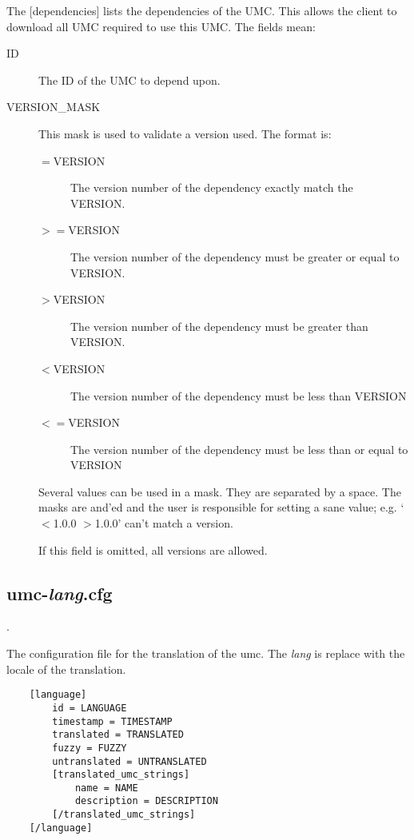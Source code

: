 The [dependencies] lists the dependencies of the UMC. This allows the client
to download all UMC required to use this UMC. The fields mean:
\begin{description}
\item[ID]
	The ID of the UMC to depend upon.

\item[VERSION\_MASK]
	This mask is used to validate a version used. The format is:
	\begin{description}
	\item[$=$VERSION]
		The version number of the dependency exactly match the VERSION.

	\item[$>=$VERSION]
		The version number of the dependency must be greater or equal to
		VERSION.

	\item[$>$VERSION]
		The version number of the dependency must be greater than VERSION.

	\item[$<$VERSION]
		The version number of the dependency must be less than VERSION
	\item[$<=$VERSION]
		The version number of the dependency must be less than or equal to
		VERSION

	\end{description}
	Several values can be used in a mask. They are separated by a space. The
	masks are and'ed and the user is responsible for setting a sane value;
	e.g. `$<$1.0.0 $>$1.0.0' can't match a version.

	If this field is omitted, all versions are allowed.

\end{description}


\subsection{umc-\emph{lang}.cfg}
\label{section:communication_protocol:server:umc-lang.cfg}.

The configuration file for the translation of the umc. The
\emph{lang} is replace with the locale of the translation.

\begin{lstlisting}
	[language]
		id = LANGUAGE
		timestamp = TIMESTAMP
		translated = TRANSLATED
		fuzzy = FUZZY
		untranslated = UNTRANSLATED
		[translated_umc_strings]
			name = NAME
			description = DESCRIPTION
		[/translated_umc_strings]
	[/language]
\end{lstlisting}



